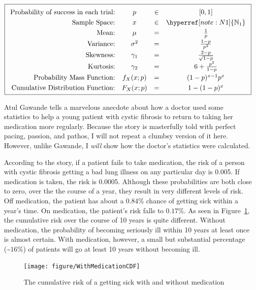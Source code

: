 \documentclass[nohyper,justified,marginals=raggedright]{tufte-book}\usepackage[]{graphicx}\usepackage[]{color}
\newenvironment{knitrout}{}{} %
\begin{document}
\begin{equation*}
\boxed{
\setlength{\extrarowheight}{3pt}
\begin{array}{rccc}
\text{Probability of success in each trial:}  &p&\in&[0,1] \\
\text{Sample Space:} & x&\in& \hyperref [note:N1]{\mathbb{N}_1}\\
\text{Mean:} & \mu&=& \frac{1}{p}\\
\text{Variance:} & \sigma^2&=&\frac{1-p}{p^2}\\
\text{Skewness:} & \gamma_1&=&\frac{2-p}{\sqrt{1-p}} \\
\text{Kurtosis:} & \gamma_2&=&6+\frac{p^2}{1-p}\\
\text{Probability Mass Function:} & f_X(x;p)&=&(1-p)^{x-1}p^x \\
\text{Cumulative Distribution Function:} & F_X(x;p)&=& 1-(1-p)^x \\
\end{array}
}
\end{equation*}

Atul Gawande \citeyearpar[p. 219--223]{gawande2007better} tells a marvelous anecdote about how a doctor used some statistics to help a young patient with cystic fibrosis to return to taking her medication more regularly. Because the story is masterfully told with perfect pacing, passion, and pathos, I will not repeat a clumbsy version of it here. However, unlike Gawande, I \emph{will} show how the doctor's statistics were calculated.

According to the story, if a patient fails to take medication, the risk of a person with cystic fibrosis getting a bad lung illness on any particular day is 0.005. If medication is taken, the risk is 0.0005. Although these probabilities are both close to zero, over the the course of a year, they result in very different levels of risk. Off medication, the patient has about a $0.84$\% chance of getting sick within a year's time. On medication, the patient's risk falls to $0.17$\%. As seen in Figure~\ref{fig:CysticFibrosisRisk}, the cumulative risk over the course of 10 years is quite different. Without medication, the probability of becoming seriously ill within 10 years at least once is almost certain. With medication, however, a small but substantial percentage (\textasciitilde$16$\%) of patients will go at least 10 years without becoming ill. 

\begin{figure}
\begin{knitrout}
\color{fgcolor}
\texttt{[image: figure/WithMedicationCDF]} 

\end{knitrout}
\caption{The cumulative risk of a getting sick with and without medication}
\label{fig:CysticFibrosisRisk}
\end{figure}
\end{document}
